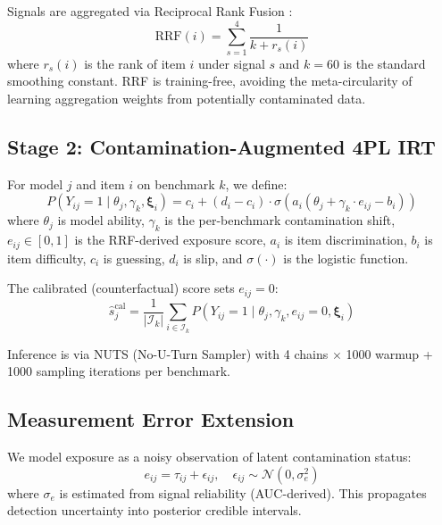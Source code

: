 \documentclass[11pt,a4paper]{article}
\begin{document}
Signals are aggregated via Reciprocal Rank Fusion \citep{cormack2009reciprocal}:
\begin{equation}
\text{RRF}(i) = \sum_{s=1}^{4} \frac{1}{k + r_s(i)}
\end{equation}
where $r_s(i)$ is the rank of item $i$ under signal $s$ and $k=60$ is the standard smoothing constant.
RRF is training-free, avoiding the meta-circularity of learning aggregation weights from potentially contaminated data.

\subsection{Stage 2: Contamination-Augmented 4PL IRT}

For model $j$ and item $i$ on benchmark $k$, we define:
\begin{equation}
P(Y_{ij}=1 \mid \theta_j, \gamma_k, \boldsymbol{\xi}_i) = c_i + (d_i - c_i) \cdot \sigma\!\left(a_i(\theta_j + \gamma_k \cdot e_{ij} - b_i)\right)
\label{eq:4pl}
\end{equation}
where $\theta_j$ is model ability, $\gamma_k$ is the per-benchmark contamination shift, $e_{ij} \in [0,1]$ is the RRF-derived exposure score, $a_i$ is item discrimination, $b_i$ is item difficulty, $c_i$ is guessing, $d_i$ is slip, and $\sigma(\cdot)$ is the logistic function.

The calibrated (counterfactual) score sets $e_{ij} = 0$:
\begin{equation}
\hat{s}_j^{\text{cal}} = \frac{1}{|\mathcal{I}_k|}\sum_{i \in \mathcal{I}_k} P(Y_{ij}=1 \mid \theta_j, \gamma_k, e_{ij}=0, \boldsymbol{\xi}_i)
\end{equation}

Inference is via NUTS (No-U-Turn Sampler) with 4 chains $\times$ 1000 warmup + 1000 sampling iterations per benchmark.

\subsection{Measurement Error Extension}

We model exposure as a noisy observation of latent contamination status:
\begin{equation}
e_{ij} = \tau_{ij} + \epsilon_{ij}, \quad \epsilon_{ij} \sim \mathcal{N}(0, \sigma_e^2)
\end{equation}
where $\sigma_e$ is estimated from signal reliability (AUC-derived).
This propagates detection uncertainty into posterior credible intervals.
\end{document}
